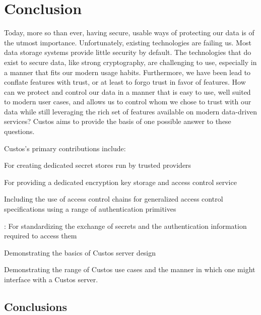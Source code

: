 \chapter{Conclusion}
\label{chap:conclusion}

Today, more so than ever, having secure, usable ways of protecting our
data is of the utmost importance. Unfortunately, existing technologies
are failing us. Most data storage systems provide little security by
default. The technologies that do exist to secure data, like strong
cryptography, are challenging to use, especially in a manner that fits
our modern usage habits. Furthermore, we have been lead to conflate
features with trust, or at least to forgo trust in favor of
features. How can we protect and control our data in a manner that is
easy to use, well suited to modern user cases, and allows us to
control whom we chose to trust with our data while still leveraging
the rich set of features available on modern data-driven services?
Custos aims to provide the basis of one possible answer to these
questions.

Custos's primary contributions include:

\begin{packed_desc}
\item[Trust-Separation Architecture:] For creating dedicated secret
  stores run by trusted providers
\item[``Key Storage as a Service Platform:] For providing a dedicated
  encryption key storage and access control service
\item[A generic, flexible access control scheme:] Including the use of
  access control chains for generalized access control specifications
  using a range of authentication primitives
\item[Custos protocol]: For standardizing the exchange of secrets and
  the authentication information required to access them
\item[Custos Server Design and Implementing:] Demonstrating the basics
  of Custos server design
\item[Several Proof-of-Concept Custos Applications:] Demonstrating the
  range of Custos use cases and the manner in which one might
  interface with a Custos server.
\end{packed_desc}

\section{Conclusions}

